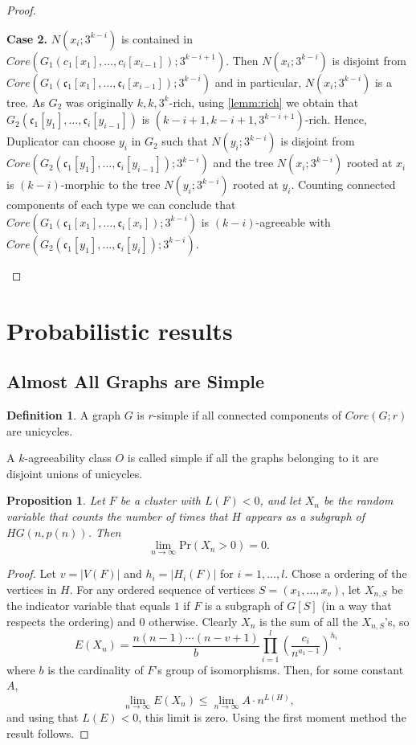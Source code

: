 \documentclass[11pt,notitlepage,a4paper]{article}
\newtheorem{proposition}{Proposition}[section]
\theoremstyle{definition}
\newtheorem{definition}{Definition}[section]
\newcommand{\cc}{\mathfrak{c}}
\newcommand{\Ln}{\lim\limits_{n\to \infty}}
\begin{document}
\begin{proof}
\begin{itemize}[leftmargin=*]
			\par
		\textbf{Case 2.} $N(x_i;3^{k-i})$ is contained in 
			$Core(G_1(c_1[x_1],\dots,c_i[x_{i-1}]);3^{k-i+1})$. Then
			$N(x_i;3^{k-i})$ is disjoint from $Core(G_1(\cc_1[x_1],\dots,\cc_i[x_{i-1}]);3^{k-i})$
			and in particular, $N(x_i;3^{k-i})$ is a tree. As $G_2$
			was originally $k,k,3^k$-rich, using \cref{lemm:rich} we obtain
			that $G_2(\cc_1[y_1],\dots,\cc_i[y_{i-1}])$ is
			$(k-i+1,k-i+1,3^{k-i+1})$-rich. Hence,
			Duplicator can choose $y_i$ in $G_2$ such that $N(y_i;3^{k-i})$ is disjoint from \\
			$Core(G_2(\cc_1[y_1],\dots,\cc_i[y_{i-1}]);3^{k-i})$ and the tree $N(x_i;3^{k-i})$
			rooted at $x_i$ is $(k-i)$-morphic to the tree $N(y_i;3^{k-i})$ rooted at $y_i$.
			Counting connected components of each type we can conclude that
			$Core(G_1(\cc_1[x_1],\dots,\cc_i[x_i]);3^{k-i})$
			is $(k-i)$-agreeable with  $Core(G_2(\cc_1[y_1],\dots,\cc_i[y_i]);3^{k-i})$.
		  	\end{itemize}
\end{proof}

\section{Probabilistic results}


\subsection{Almost All Graphs are Simple}

\begin{definition} 
	A graph $G$ is $r$-simple if all connected components of $Core(G;r)$
	are unicycles. 
\end{definition}

A $k$-agreeability class $O$ is called simple if all the graphs
belonging to it are disjoint unions of unicycles.
 

\begin{proposition}\label{prop:supercritical}
	Let $F$ be a cluster with $L(F)<0$, and let $X_n$ be the
	random variable that counts the number of times that $H$ appears
	as a subgraph of $HG(n,p(n))$. Then
	\[\Ln \mathrm{Pr}(X_n>0)=0. \]
\end{proposition}
\begin{proof}
	Let $v=|V(F)|$ and $h_i=|H_i(F)|$ for $i=1,\dots, l$. 
	Chose a ordering of the vertices in $H$. 
	For any ordered sequence of vertices $S=(x_1, \dots, x_v)$, 
	let $X_{n,S}$ be the indicator variable that equals $1$ if $F$
	is a subgraph of $G[S]$ (in a way that respects the ordering) and
	$0$ otherwise. Clearly $X_n$ is the sum of all the $X_{n,S}$'s, so
	\[ E(X_n)= \frac{n(n-1)\cdots (n-v+1)}{b} \prod_{i=1}^{l}
	\left( \frac{c_i}{n^{a_1-1}}\right)^{h_i}, \] 
	where $b$ is the cardinality of $F$'s group of isomorphisms. 
	Then, for some constant $A$,
	\[ \Ln E(X_n)\leq \Ln A\cdot n^{L(H)}, \]
	and using that $L(E)<0$, this limit is zero.
	Using the first moment method the result follows. 
\end{proof}
\end{document}
